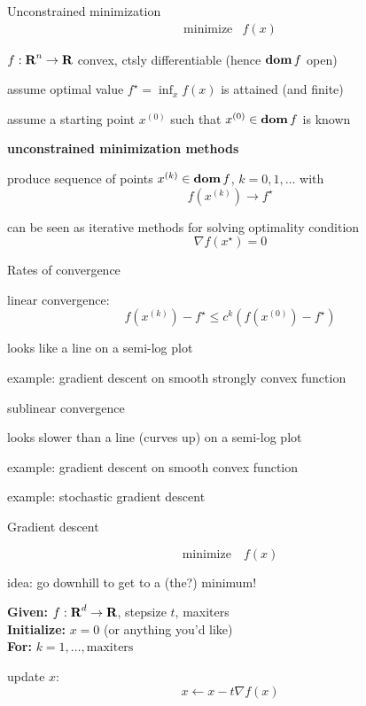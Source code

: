 \documentclass[presentation,xcolor={usenames,dvipsnames}]{beamer}
\begin{document}
\begin{frame}{Unconstrained minimization} \vspace*{-2ex}
\[
 \begin{array}{ll}
 \mbox{minimize} & f(x)
 \end{array}
\]
\bit
\item $f: {\mbox{\bf R}}^n \to {\mbox{\bf R}}$ convex, ctsly differentiable
 (hence $\mathop{\bf dom} f$ open)
\item assume optimal value $f^\star = \inf_x f(x)$ is attained
 (and finite)
\item assume a starting point $x^{(0)}$ such that
$x^{(0)} \in\mathop{\bf dom} f$ is known
\eit
\vfil

\textbf{unconstrained minimization methods}
\bit
\item produce sequence of points $x^{(k)} \in\mathop{\bf dom} f$, $k=0,1,\ldots $
with
\[
 f(x^{(k)})\rightarrow f^\star
\]
\item can be seen as iterative methods for solving
optimality condition
\[
\nabla f(x^\star) = 0
\]
\eit

\end{frame}

\begin{frame}{Rates of convergence}

\bit
\item linear convergence:
\[
f(x^{(k)}) - f^\star \leq c^k  (f(x^{(0)}) - f^\star)
\]
\bit
\item looks like a line on a semi-log plot
\item example: gradient descent on smooth strongly convex function
\eit
\item sublinear convergence
\bit
\item looks slower than a line (curves up) on a semi-log plot
\item example: gradient descent on smooth convex function
\item example: stochastic gradient descent
\eit
\eit
\end{frame}

\begin{frame}{Gradient descent}

\[
\text{minimize} \quad f(x)
\]

idea: go downhill to get to a (the?) minimum!
\vfill
\begin{algorithm}[H]
  \caption{Gradient descent}
  \textbf{Given:} $f: {\mbox{\bf R}}^d \to {\mbox{\bf R}}$, stepsize $t$, maxiters \\
  \textbf{Initialize:} $x = 0$ (or anything you'd like) \\
  \textbf{For:} $k = 1,\ldots,\text{maxiters}$
  \bit
  \item update $x$:
  \[
  x \leftarrow x - t \nabla f(x)
  \]
  \eit
\end{algorithm}

\end{frame}
\end{document}
